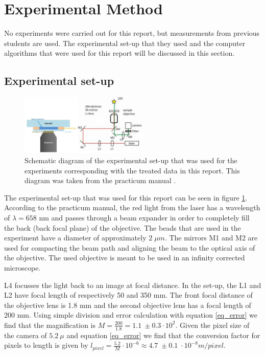 \section{Experimental Method}

No experiments were carried out for this report, but measurements from previous students are used. The experimental set-up that they used and the computer algorithms that were used for this report will be discussed in this section.

\subsection{Experimental set-up}

\begin{figure}
    \centering
    \includegraphics[width=0.55\textwidth,keepaspectratio]{figures/setup.png}
    \caption{Schematic diagram of the experimental set-up that was used for the experiments corresponding with the treated data in this report. This diagram was taken from the practicum manual \cite{practicum_manual}.}
    \label{fig_setup}
\end{figure}

The experimental set-up that was used for this report can be seen in figure \ref{fig_setup}.
According to the practicum manual, the red light from the laser has a wavelength of $\lambda=658$ nm and passes through a beam expander in order to completely fill the back (back focal plane) of the objective.
The beads that are used in the experiment have a diameter of approximately $ 2 \;\mu m$.
The mirrors M1 and M2 are used for compacting the beam path and aligning the beam to the optical axis of the objective.
The used objective is meant to be used in an infinity corrected microscope.

L4 focusses the light back to an image at focal distance.
In the set-up, the L1 and L2 have focal length of respectively 50 and 350 mm. The front focal distance of the objective lens is 1.8 mm and the second objective lens has a focal length of 200 mm. Using simple division and error calculation with equation \ref{eq_error} we find that the magnification is  $ M = \frac{200}{1.8} = 1.1  \: \pm 0.3 \cdot 10^2$. Given the pixel size of the camera of $ 5.2 \: \mu $  and equation  \ref{eq_error} we find that the conversion factor for pixels to length is given by $l_{pixel} = \frac{5.2}{M} \cdot 10^{-6} \approx 4.7 \; \pm 0.1 \; \cdot 10^{-8} m/pixel$. 

